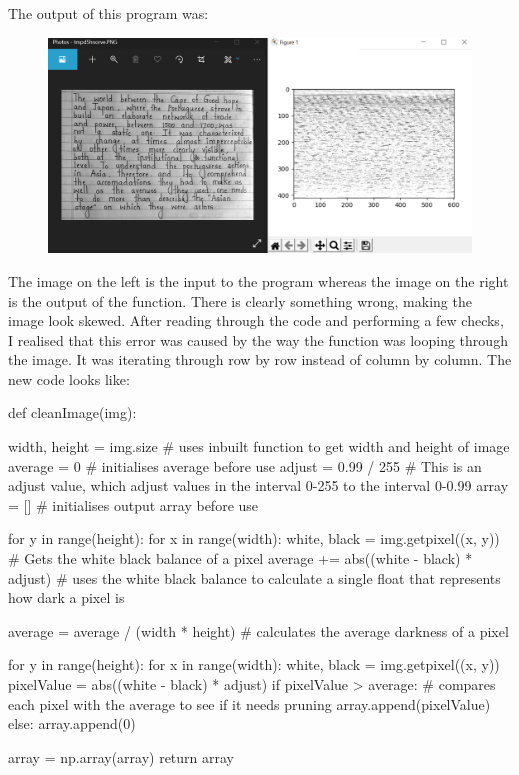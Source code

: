 \documentclass{report}
\begin{document}
The output of this program was:
\begin{figure}[H]
    \centering
    \includegraphics[width=5in]{Images/Development and Testing/Stage 4/Testing for Clean Image/Test 1, Weird Noise.png}
    \label{fig:Testing for Clean Image}
\end{figure}
\noindent The image on the left is the input to the program whereas the image on the right is the output of the function. There is clearly something wrong, making the image look skewed. After reading through the code and performing a few checks, I realised that this error was caused by the way the function was looping through the image. It was iterating through row by row instead of column by column. The new code looks like:
\begin{python}
def cleanImage(img):

    width, height = img.size  # uses inbuilt function to get width and height of image
    average = 0  # initialises average before use
    adjust = 0.99 / 255  # This is an adjust value, which adjust values in the interval 0-255 to the interval 0-0.99
    array = []  # initialises output array before use

    for y in range(height):
        for x in range(width):
            white, black = img.getpixel((x, y))  # Gets the white black balance of a pixel
            average += abs((white - black) * adjust)  # uses the white black balance to calculate a single float that represents how dark a pixel is

    average = average / (width * height) # calculates the average darkness of a pixel

    for y in range(height):
        for x in range(width):
            white, black = img.getpixel((x, y))
            pixelValue = abs((white - black) * adjust)
            if pixelValue > average:  # compares each pixel with the average to see if it needs pruning
                array.append(pixelValue)
            else:
                array.append(0)

    array = np.array(array)
    return array
\end{python}
\end{document}
